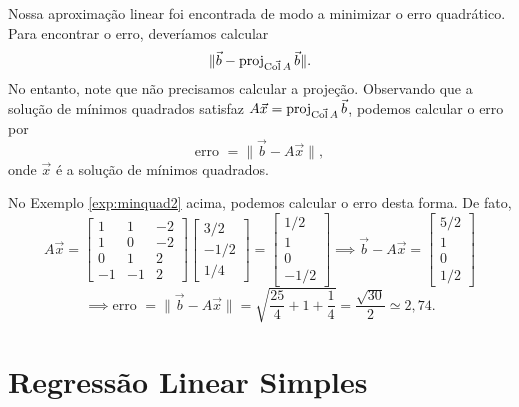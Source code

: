 \documentclass[../livro.tex]{subfiles}  %
\begin{document}
Nossa aproximação linear foi encontrada de modo a minimizar o erro quadrático. Para encontrar o erro, deveríamos calcular
\begin{equation}
\| \vec{b} - \operatorname{proj}_{\vec{\operatorname{Col} A}} \vec{b} \|.
\end{equation} No entanto, note que não precisamos calcular a projeção. Observando que a solução de mínimos quadrados satisfaz $A \vec{x} = \operatorname{proj}_{\vec{\operatorname{Col} A}} \vec{b}$, podemos calcular o erro por
\begin{equation}
\text{erro } = \| \vec{b} - A \vec{x} \|,
\end{equation} onde $\vec{x}$ é a solução de mínimos quadrados.

No Exemplo \ref{exp:minquad2} acima, podemos calcular o erro desta forma. De fato,
\begin{equation}
A \vec{x} = 
\begin{bmatrix}
  1 & 1 & -2 \\ 
  1 & 0 & -2 \\ 
  0 & 1 &  2 \\ 
  -1 & -1&  2
\end{bmatrix}
\begin{bmatrix}
  3/2 \\ -1/2 \\ 1/4
\end{bmatrix} = 
\begin{bmatrix}
  1/2 \\ 1 \\ 0 \\ -1/2
\end{bmatrix} \implies 
\vec{b} - A\vec{x} = 
\begin{bmatrix}
  5/2 \\ 1 \\ 0 \\ 1/2
\end{bmatrix}
\end{equation}
\begin{equation}
\implies \text{erro } = \| \vec{b} - A \vec{x} \| = \sqrt{\frac{25}{4} + 1 + \frac{1}{4}} = \frac{\sqrt{30}}{2} \simeq 2,74.
\end{equation}





\section{Regressão Linear Simples}
\end{document}
